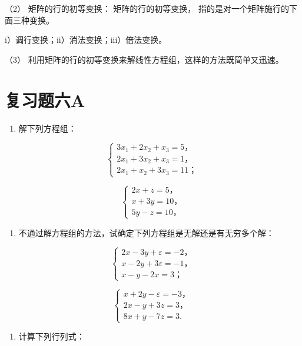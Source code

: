 （2） 矩阵的行的初等变换： 矩阵的行的初等变换，
指的是对一个矩阵施行的下面三种变换。

i）调行变换；ii）消法变换；iii）倍法变换。

（3） 利用矩阵的行的初等变换来解线性方程组，这样的方法既简单又迅速。

\section{复习题六A}

\begin{enumerate}
\item
  解下列方程组：
\end{enumerate}

\[
\left\{ \begin{array}{l} 3 x _ {1} + 2 x _ {2} + x _ {3} = 5\text{，} \\ 2 x _ {1} + 3 x _ {2} + x _ {3} = 1\text{，} \\ 2 x _ {1} + x _ {2} + 3 x _ {3} = 11\text{；} \end{array} \right. \tag {1}
\]

\[
\left\{ \begin{array}{l} 2 x + z = 5\text{，} \\ x + 3 y = 10\text{，} \\ 5 y - z = 10\text{，} \end{array} \right. \tag {2}
\]

\begin{enumerate}[start=2]
\item
  不通过解方程组的方法，试确定下列方程组是无解还是有无穷多个解：
\end{enumerate}

\[
\left\{ \begin{array}{l} 2 x - 3 y + \varepsilon = - 2\text{，} \\ x - 2 y + 3 \varepsilon = - 1\text{，} \\ x - y - 2 x = 3\text{；} \end{array} \right. \tag {1}
\]

\[
\left\{ \begin{array}{l} x + 2 y - \varepsilon = - 3\text{，} \\ 2 x - y + 3 z = 3\text{，} \\ 8 x + y - 7 z = 3. \end{array} \right. \tag {2}
\]

\begin{enumerate}[start=3]
\item
  计算下列行列式：
\end{enumerate}

